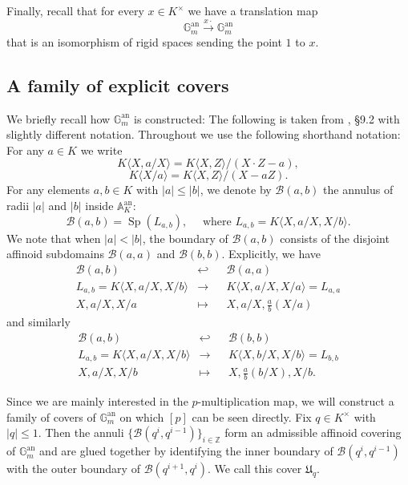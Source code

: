 \documentclass[10pt,oneside]{amsart}
\theoremstyle{definition}
\begin{document}
	Finally, recall that for every $x\in K^\times$ we have a translation map
	\[\mathbb G_m^{\operatorname{an}}\xrightarrow{x\cdot} \mathbb G_m^{\operatorname{an}}\]
	that is an isomorphism of rigid spaces sending the point $1$ to $x$.
	
	\subsection{A family of explicit covers}
	We briefly recall how $\mathbb G_m^{\operatorname{an}}$ is constructed: The following is taken from \cite{Bosch lectures}, \S 9.2 with slightly different notation. Throughout we use the following shorthand notation: For any $a\in K$ we write
	\[K\langle X,a/X\rangle = K\langle X,Z\rangle/(X\cdot Z - a), \]
	\[K\langle X/a\rangle = K\langle X,Z\rangle/(X-aZ). \]
	For any elements $a,b\in K$ with $|a|\leq |b|$, we denote by $\mathcal B(a,b)$ the annulus of radii $|a|$ and $|b|$ inside $\mathbb A_K^{\operatorname{an}}$:
	\[\mathcal B(a,b) = \operatorname{Sp}(L_{a,b}),\quad \text{ where } L_{a,b} = K\langle X,a/X, X/b\rangle. \]
	We note that when $|a|<|b|$, the boundary of $\mathcal B(a,b)$ consists of the disjoint affinoid subdomains $\mathcal B(a,a)$ and $\mathcal B(b,b)$. Explicitly, we have
	\begin{equation}\label{torus explicit cover glue map 1}
	\begin{alignedat}{2}
	\mathcal B(a,b)&\hookleftarrow&& \mathcal B(a,a)\\
	L_{a,b}=K\langle X,a/X, X/b\rangle&\rightarrow &&K\langle X,a/X, X/a \rangle=L_{a,a}\\
	X,a/X, X/a &\mapsto&& X, a/X, \frac{a}{b}(X/a)
	\end{alignedat}
	\end{equation}
	and similarly 
	\begin{equation}\label{torus explicit cover glue map 2}
	\begin{alignedat}{2}
	\mathcal B(a,b)&\hookleftarrow&& \mathcal B(b,b)\\
	L_{a,b}=K\langle  X, a/X, X/b \rangle&\rightarrow &&K\langle X, b/X, X/b \rangle=L_{b,b}\\
	X, a/X, X/b &\mapsto&& X, \frac{a}{b} (b/X), X/b.
	\end{alignedat}
	\end{equation}

	Since we are mainly interested in the $p$-multiplication map, we will construct a family of covers of $\mathbb G_m^{\operatorname{an}}$ on which $[p]$ can be seen directly. Fix $q \in K^\times$ with $|q|\leq 1$. Then the annuli $\{\mathcal B(q^i,q^{i-1})\}_{i\in\mathbb{Z}}$ form an admissible affinoid covering of $\mathbb G_m^{\operatorname{an}}$ and are glued together by identifying the inner boundary of $\mathcal B(q^i, q^{i-1})$ with the outer boundary of $\mathcal B(q^{i+1},q^i)$. We call this cover $\mathfrak U_q$. 
\end{document}
